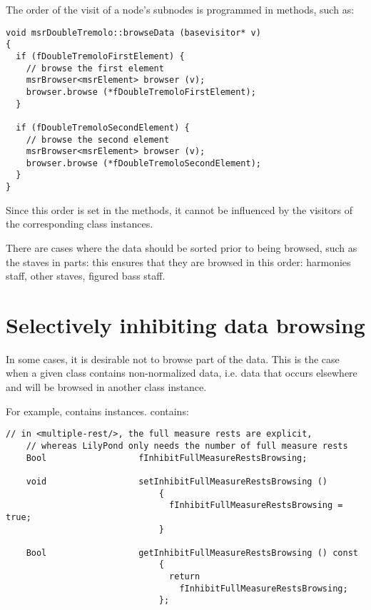 The order of the visit of a node's subnodes is programmed in  methods, such as:
\begin{lstlisting}[language=CPlusPlus,caption={{\tt msrDoubleTremolo::browseData (basevisitor* v)}}]
void msrDoubleTremolo::browseData (basevisitor* v)
{
  if (fDoubleTremoloFirstElement) {
    // browse the first element
    msrBrowser<msrElement> browser (v);
    browser.browse (*fDoubleTremoloFirstElement);
  }

  if (fDoubleTremoloSecondElement) {
    // browse the second element
    msrBrowser<msrElement> browser (v);
    browser.browse (*fDoubleTremoloSecondElement);
  }
}
\end{lstlisting}

Since this order is set in the  methods, it cannot be influenced by the visitors of the corresponding class instances.

There are cases where the data should be sorted prior to being browsed, such as the staves in parts: this ensures that they are browsed in this order: harmonies staff, other staves, figured bass staff.


\section{Selectively inhibiting data browsing}

In some cases, it is desirable not to browse part of the data. This is the case when a given class contains non-normalized data, i.e. data that occurs elsewhere and will be browsed in another class instance.

For example,  contains  instances.  contains:
\begin{lstlisting}[language=CPlusPlus]
    // in <multiple-rest/>, the full measure rests are explicit,
    // whereas LilyPond only needs the number of full measure rests
    Bool                  fInhibitFullMeasureRestsBrowsing;

    void                  setInhibitFullMeasureRestsBrowsing ()
                              {
                                fInhibitFullMeasureRestsBrowsing = true;
                              }

    Bool                  getInhibitFullMeasureRestsBrowsing () const
                              {
                                return
                                  fInhibitFullMeasureRestsBrowsing;
                              };
\end{lstlisting}


